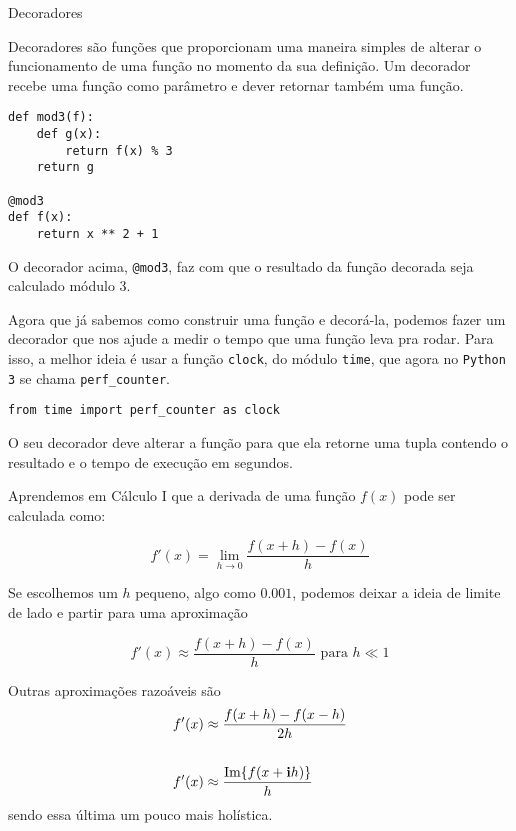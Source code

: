 \documentclass[12pt]{article}
\begin{document}
	\begin{interlude}{Decoradores \label{i:decoradores}}
	
	Decoradores são funções que proporcionam uma maneira simples de alterar o funcionamento de uma função no momento da sua definição. Um decorador recebe uma função como parâmetro e dever retornar também uma função.
	
	\begin{lstlisting}
def mod3(f):
	def g(x):
		return f(x) % 3
	return g
	
@mod3
def f(x):
	return x ** 2 + 1
	\end{lstlisting}
	
	O decorador acima, \texttt{@mod3}, faz com que o resultado da função decorada seja calculado módulo 3.
	
	\end{interlude}
	
	
	Agora que já sabemos como construir uma função e decorá-la, podemos fazer um decorador que nos ajude a medir o tempo que uma função leva pra rodar. Para isso, a melhor ideia é usar a função \texttt{clock}, do módulo \texttt{time}, que agora no \texttt{Python 3} se chama \texttt{perf\_{}counter}.
	
	\begin{lstlisting}
from time import perf_counter as clock
	\end{lstlisting}
	
	\quest O seu decorador deve alterar a função para que ela retorne uma tupla contendo o resultado e o tempo de execução em segundos.
	
	
	Aprendemos em Cálculo I que a derivada de uma função $f(x)$ pode ser calculada como:
	
		$$f'(x) = \lim_{h \to 0} \frac{f(x + h) - f(x)}{h}$$
	
	Se escolhemos um $h$ pequeno, algo como $0.001$, podemos deixar a ideia de limite de lado e partir para uma aproximação
	
		$$f'(x) \approx \frac{f(x + h) - f(x)}{h} \text{ para } h \ll 1$$

	Outras aproximações razoáveis são	
		\begin{align*}
		f'(x) &\approx \frac{f(x + h) - f(x - h)}{2h}\\
		\\		
		f'(x) &\approx \frac{ \text{Im}\{f(x + \mathbf{i}h)\} }{h} 
		\end{align*}	
	sendo essa última um pouco mais holística.\\
	
\end{document}
